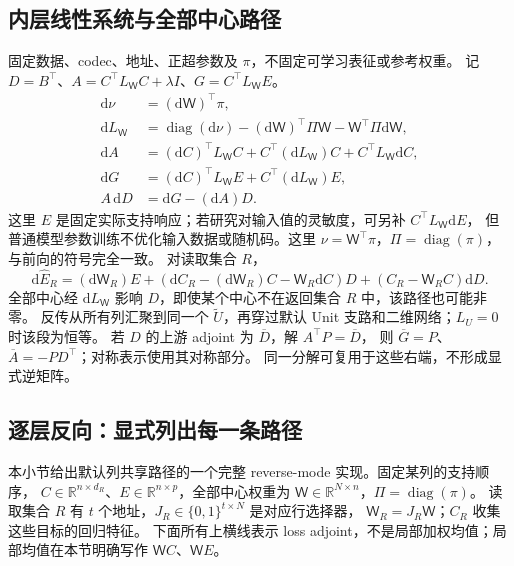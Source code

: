 \documentclass[11pt,UTF8,fontset=fandol]{ctexart}
\numberwithin{equation}{section}
\theoremstyle{definition}
\newcommand{\R}{\mathbb R}
\begin{document}
\subsection{内层线性系统与全部中心路径}
固定数据、codec、地址、正超参数及 $\pi$，不固定可学习表征或参考权重。
记 $D=B^\top$、$A=C^\top L_{\mathsf W}C+\lambda I$、$G=C^\top L_{\mathsf W}E$。
\begin{equation}
 \begin{aligned}
 \mathrm d\nu&=(\mathrm d\mathsf W)^\top\pi,\\
 \mathrm dL_{\mathsf W}&=\operatorname{diag}(\mathrm d\nu)-(\mathrm d\mathsf W)^\top\Pi \mathsf W-\mathsf W^\top\Pi\mathrm d\mathsf W,\\
 \mathrm dA&=(\mathrm dC)^\top L_{\mathsf W}C+C^\top(\mathrm dL_{\mathsf W})C+C^\top L_{\mathsf W}\mathrm dC,\\
 \mathrm dG&=(\mathrm dC)^\top L_{\mathsf W}E+C^\top(\mathrm dL_{\mathsf W})E,\\
 A\,\mathrm dD&=\mathrm dG-(\mathrm dA)D.
 \end{aligned}
 \label{v51:eq:shared-differentials}
\end{equation}
这里 $E$ 是固定实际支持响应；若研究对输入值的灵敏度，可另补 $C^\top L_{\mathsf W}\mathrm dE$，
但普通模型参数训练不优化输入数据或随机码。这里 $\nu=\mathsf W^\top\pi$，$\Pi=\operatorname{diag}(\pi)$，
与前向的符号完全一致。
对读取集合 $R$，
\begin{equation}
 \mathrm d\widehat E_R=(\mathrm d\mathsf W_R)E+
 (\mathrm dC_R-(\mathrm d\mathsf W_R)C-\mathsf W_R\mathrm dC)D+(C_R-\mathsf W_R C)\mathrm dD.
 \label{v51:eq:prediction-differential}
\end{equation}
全部中心经 $\mathrm dL_{\mathsf W}$ 影响 $D$，即使某个中心不在返回集合 $R$ 中，该路径也可能非零。
反传从所有列汇聚到同一个 $\widetilde U$，再穿过默认 Unit 支路和二维网络；$L_U=0$ 时该段为恒等。
若 $D$ 的上游 adjoint 为 $\overline D$，解 $A^\top P=\overline D$，
则 $\overline G=P$、$\overline A=-PD^\top$；对称表示使用其对称部分。
同一分解可复用于这些右端，不形成显式逆矩阵。


\subsection{逐层反向：显式列出每一条路径}
本小节给出默认列共享路径的一个完整 reverse-mode 实现。固定某列的支持顺序，
$C\in\R^{n\times d_R}$、$E\in\R^{n\times p}$，全部中心权重为
$\mathsf W\in\R^{N\times n}$，$\Pi=\operatorname{diag}(\pi)$。
读取集合 $R$ 有 $t$ 个地址，$J_R\in\{0,1\}^{t\times N}$ 是对应行选择器，
$\mathsf W_R=J_R\mathsf W$；$C_R$ 收集这些目标的回归特征。
下面所有上横线表示 loss adjoint，不是局部加权均值；局部均值在本节明确写作 $\mathsf W C$、$\mathsf W E$。
\end{document}
